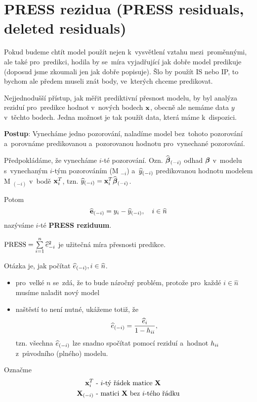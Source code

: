 \section{PRESS rezidua (PRESS residuals, deleted residuals)}

Pokud budeme chtít model použít nejen k~vysvětlení vztahu mezi~proměnnými, ale také pro~predikci, hodila by se~míra vyjadřující jak dobře model predikuje (doposud jsme zkoumali jen jak dobře popisuje). Šlo by použít IS nebo IP, to bychom ale předem museli znát body, ve~kterých chceme predikovat.

Nejjednodušší přístup, jak měřit prediktivní přesnost modelu, by byl analýza reziduí pro~predikce hodnot v~nových bodech $\mathbf{x}$, obecně ale nemáme data $y$ v~těchto bodech. Jedna možnost je tak použít data, která máme k~dispozici.

\textbf{Postup}: Vynecháme jedno pozorování, naladíme model bez~tohoto pozorování a~porovnáme predikovanou a~pozorovanou hodnotu pro~vynechané pozorování.

Předpokládáme, že vynecháme $i$-té pozorování. Ozn. $\widehat{\boldsymbol{\beta}}_{(-i)}$ odhad $\boldsymbol{\beta}$ v~modelu s~vynechaným $i$-tým pozorováním (M $_{-i}$) a~$\widehat{y}_{(-i)}$ predikovanou hodnotu modelem M $_{(-i)}$ v~bodě $\mathbf{x}_i^T$, tzn. $\widehat{y}_{(-i)} = \mathbf{x}_i^T \widehat{\boldsymbol{\beta}}_{(-i)}$.

Potom
 $$
\widehat{\mathbf{e}}_{(-i)} = y_i - \widehat{y}_{(-i)}, \quad i\in\widehat{n}
 $$
nazýváme $i$-té \textbf{PRESS reziduum}.

 $\mathrm{PRESS} = \sum\limits_{i=1}^{n} \widehat{e}_{-i}^2$ je užitečná míra přesnosti predikce.

\begin{remark}
	Otázka je, jak počítat $\widehat{e}_{(-i)}, i\in\widehat{n} $.
	\begin{itemize}
		\item pro~velké $n$ se~zdá, že to bude náročný problém, protože pro~každé $i \in \widehat{n}$ musíme naladit nový model
		\item naštěstí to není nutné, ukážeme totiž, že
		 $$
		\widehat{e}_{(-i)} = \frac{\widehat{e}_i}{1 - h_{ii}},
		 $$
		tzn. všechna $\widehat{e}_{(-i)}$ lze snadno spočítat pomocí reziduí a~hodnot $h_{ii}$ z~původního (plného) modelu.
	\end{itemize}
\end{remark}

Označme
\begin{align*}
	\mathbf{x}_i^T & \text{ - $i$-tý řádek matice } \mathbf{X} \\
	\mathbf{X}_{(-i)} & \text{ - matici $\mathbf{X}$ bez~$i$-tého řádku}
\end{align*}

